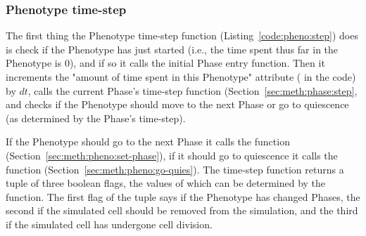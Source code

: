 \subsubsection{Phenotype time-step}\label{sec:meth:pheno:step}

The first thing the Phenotype time-step function (Listing~\ref{code:pheno:step}) does is check if the Phenotype has just started (i.e., the time spent thus far in the Phenotype is 0), and if so it calls the initial Phase entry function. Then it increments the "amount of time spent in this Phenotype" attribute ( in the code) by $dt$, calls the current Phase's time-step function (Section~\ref{sec:meth:phase:step}, and checks if the Phenotype should move to the next Phase or go to quiescence (as determined by the Phase's time-step). 

If the Phenotype should go to the next Phase it calls the  function (Section~\ref{sec:meth:pheno:set-phase}), if it should go to quiescence it calls the  function (Section~\ref{sec:meth:pheno:go-quies}). The time-step function returns a tuple of three boolean flags, the values of which can be determined by the  function. The first flag of the tuple says if the Phenotype has changed Phases, the second if the simulated cell should be removed from the simulation, and the third if the simulated cell has undergone cell division.

